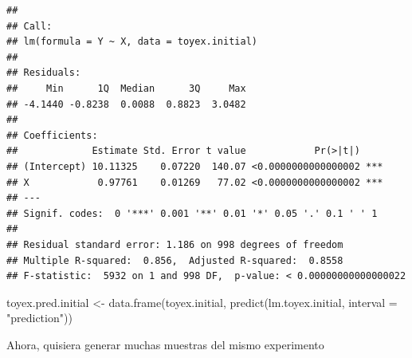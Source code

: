 \documentclass[
  12pt,
]{book}
\newenvironment{Shaded}{\begin{snugshade}}{\end{snugshade}}
\newcommand{\AttributeTok}[1]{\textcolor[rgb]{0.77,0.63,0.00}{#1}}
\newcommand{\FunctionTok}[1]{\textcolor[rgb]{0.00,0.00,0.00}{#1}}
\newcommand{\NormalTok}[1]{#1}
\newcommand{\OtherTok}[1]{\textcolor[rgb]{0.56,0.35,0.01}{#1}}
\newcommand{\StringTok}[1]{\textcolor[rgb]{0.31,0.60,0.02}{#1}}
\theoremstyle{definition}
\theoremstyle{definition}
\theoremstyle{definition}
\theoremstyle{remark}
\begin{document}
\begin{verbatim}
## 
## Call:
## lm(formula = Y ~ X, data = toyex.initial)
## 
## Residuals:
##     Min      1Q  Median      3Q     Max 
## -4.1440 -0.8238  0.0088  0.8823  3.0482 
## 
## Coefficients:
##             Estimate Std. Error t value            Pr(>|t|)    
## (Intercept) 10.11325    0.07220  140.07 <0.0000000000000002 ***
## X            0.97761    0.01269   77.02 <0.0000000000000002 ***
## ---
## Signif. codes:  0 '***' 0.001 '**' 0.01 '*' 0.05 '.' 0.1 ' ' 1
## 
## Residual standard error: 1.186 on 998 degrees of freedom
## Multiple R-squared:  0.856,  Adjusted R-squared:  0.8558 
## F-statistic:  5932 on 1 and 998 DF,  p-value: < 0.00000000000000022
\end{verbatim}

\begin{Shaded}
\begin{Highlighting}[]
\NormalTok{toyex.pred.initial }\OtherTok{\textless{}{-}} \FunctionTok{data.frame}\NormalTok{(toyex.initial, }\FunctionTok{predict}\NormalTok{(lm.toyex.initial, }
    \AttributeTok{interval =} \StringTok{"prediction"}\NormalTok{))}
\end{Highlighting}
\end{Shaded}

Ahora, quisiera generar muchas muestras del mismo experimento
\end{document}
